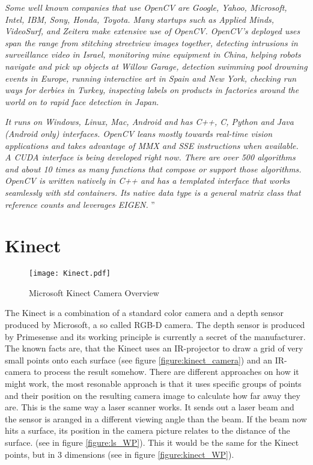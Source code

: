 \textit{ 
Some well known companies that use OpenCV are Google, Yahoo, Microsoft, Intel, IBM, Sony, Honda, Toyota. 
Many startups such as Applied Minds, VideoSurf, and Zeitera make extensive use of OpenCV. OpenCV’s deployed 
uses span the range from stitching streetview images together, detecting intrusions in surveillance video in 
Israel, monitoring mine equipment in China, helping robots navigate and pick up objects at Willow Garage, 
detection swimming pool drowning events in Europe, running interactive art in Spain and New York, checking
run ways for derbies in Turkey, inspecting labels on products in factories around the world on to rapid face
 detection in Japan.
}

\textit{ 
It runs on Windows, Linux, Mac, Android and has C++, C, Python and Java (Android only) interfaces. 
OpenCV leans mostly towards real-time vision applications and takes advantage of MMX and SSE instructions
 when available. A CUDA interface is being developed right now. There are over 500 algorithms and about 10 
 times as many functions that compose or support those algorithms. OpenCV is written natively in C++ and has 
 a templated interface that works seamlessly with std containers. Its native data type is a general matrix class 
 that reference counts and leverages EIGEN.
}''
\section{Kinect}
\begin{figure}[htp]
	\centering
	\texttt{[image: Kinect.pdf]}
	\caption{Microsoft Kinect Camera Overview}
	\label{figure:kinect_camera}
\end{figure}

The Kinect is a combination of a standard color camera and a depth sensor produced by Microsoft, a so called RGB-D camera. 
The depth sensor is produced by Primesense and its working principle is currently a secret of the manufacturer. 
The known facts are, that the Kinect uses an IR-projector to draw a grid of very small points onto each surface 
(see figure \vref{figure:kinect_camera}) and an IR-camera to process the result somehow.  
There are different approaches on how it might work, the most resonable approach is that it uses 
specific groups of points and their position on the resulting camera image to calculate how far 
away they are. This is the same way a laser scanner works. 
It sends out a laser beam and the sensor is aranged in a different viewing angle than the beam.
If the beam now hits a surface, its position in the camera picture relates to the distance of the surface.
(see in figure \vref{figure:ls_WP}). This it would be the same for the Kinect points, but in 3 dimensions 
(see in figure \vref{figure:kinect_WP}).

